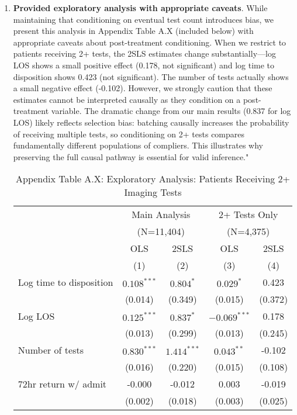 \documentclass[11pt]{article}
\newcommand{\1}{\hbox{\rm 1\kern-.35em 1}}
\begin{document}
{{\begin{enumerate}
    \item \textbf{Provided exploratory analysis with appropriate caveats}. While maintaining that conditioning on eventual test count introduces bias, we present this analysis in Appendix Table A.X (included below) with appropriate caveats about post-treatment conditioning. When we restrict to patients receiving 2+ tests, the 2SLS estimates change substantially---log LOS shows a small positive effect (0.178, not significant) and log time to disposition shows 0.423 (not significant). The number of tests actually shows a small negative effect (-0.102). However, we strongly caution that these estimates cannot be interpreted causally as they condition on a post-treatment variable. The dramatic change from our main results (0.837 for log LOS) likely reflects selection bias: batching causally increases the probability of receiving multiple tests, so conditioning on 2+ tests compares fundamentally different populations of compliers. This illustrates why preserving the full causal pathway is essential for valid inference."


\begin{table}[ht]
\centering
\caption*{Appendix Table A.X: Exploratory Analysis: Patients Receiving 2+ Imaging Tests}
\label{tab:exploratory_2plus}
\begin{threeparttable}
\begin{tabular}{lcccc}
\toprule
& \multicolumn{2}{c}{Main Analysis} & \multicolumn{2}{c}{2+ Tests Only} \\
& \multicolumn{2}{c}{(N=11,404)} & \multicolumn{2}{c}{(N=4,375)} \\
\cmidrule(lr){2-3} \cmidrule(lr){4-5}
& OLS & 2SLS & OLS & 2SLS \\
& (1) & (2) & (3) & (4) \\
\midrule
Log time to disposition & $0.108^{***}$ & $0.804^{*}$ & $0.029^{*}$ & 0.423 \\
& (0.014) & (0.349) & (0.015) & (0.372) \\[0.5em]

Log LOS & $0.125^{***}$ & $0.837^{*}$ & $-0.069^{***}$ & 0.178 \\
& (0.013) & (0.299) & (0.013) & (0.245) \\[0.5em]

Number of tests & $0.830^{***}$ & $1.414^{***}$ & $0.043^{**}$ & -0.102 \\
& (0.016) & (0.220) & (0.015) & (0.108) \\[0.5em]

72hr return w/ admit & -0.000 & -0.012 & 0.003 & -0.019 \\
& (0.002) & (0.018) & (0.003) & (0.025) \\[0.5em]


\end{tabular}
\end{threeparttable}
\end{table}
\end{enumerate}}}
\end{document}
